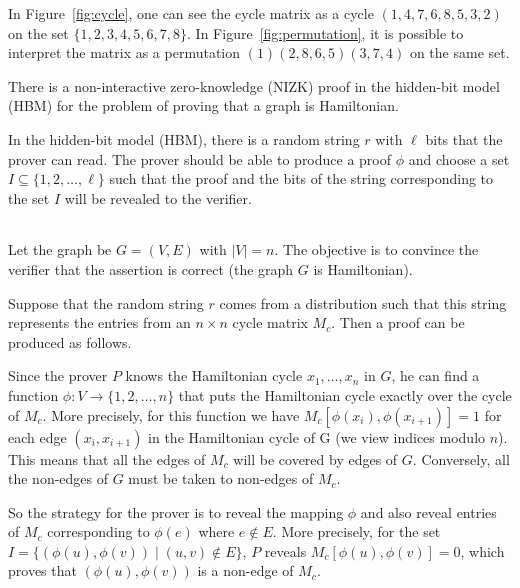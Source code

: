 In Figure~\ref{fig:cycle}, one can see the cycle matrix as a cycle $(1,4,7,6,8,5,3,2)$
on the set $\{1,2,3,4,5,6,7,8\}$. In Figure~\ref{fig:permutation}, it is possible to
interpret the matrix as a permutation $(1)(2,8,6,5)(3,7,4)$ on the same set.

\begin{theorem}
There is a non-interactive zero-knowledge (NIZK) proof in the
hidden-bit model (HBM) for the problem of proving that a graph is Hamiltonian.
\end{theorem}
\proof
In the hidden-bit model (HBM), there is a random string $r$ with $\ell$ bits that the prover
can read. The prover should be able to produce a proof $\phi$ and choose a set
$I\subseteq\{1,2,\ldots,\ell\}$ such that the proof and the bits of the string corresponding to
the set $I$ will be revealed to the verifier.
\begin{table}[ht]
\centering
\begin{tabular}{r c l}
\end{tabular}
\end{table}


Let the graph be $G=(V,E)$ with $|V|=n$. \DIFaddbegin {}\DIFaddend The objective is to convince the verifier that the assertion is correct (the graph $G$
is Hamiltonian).

Suppose that the random string $r$ comes from a distribution
such that this string represents the entries from an $n\times n$ cycle matrix $M_c$.
Then a proof can be produced as follows.

Since the prover $P$ knows the Hamiltonian cycle $x_1,\ldots,x_n$ in $G$, he can find a
function $\phi:V\rightarrow \{1,2,\ldots,n\}$ that puts the Hamiltonian cycle exactly
over the cycle of $M_c$. More precisely, for this function we have
$M_c[\phi(x_i),\phi(x_{i+1})]=1$ for each edge $(x_i,x_{i+1})$ in the Hamiltonian cycle of G
(we view indices modulo $n$).
This means that all the edges of $M_c$ will be covered by edges of $G$. Conversely, all the
non-edges of $G$ must be taken to non-edges of $M_c$.

So the strategy for the prover is to reveal the mapping $\phi$ and also reveal entries of $M_c$ corresponding to $\phi(e)$ where $e \notin E$\DIFaddbegin {}\DIFaddend . More precisely, for the set
$I=\{(\phi(u),\phi(v)) \mid (u,v)\notin E\}$, $P$ reveals
$M_c[\phi(u),\phi(v)]=0$,
which proves that $(\phi(u),\phi(v))$ is a non-edge of $M_c$.

